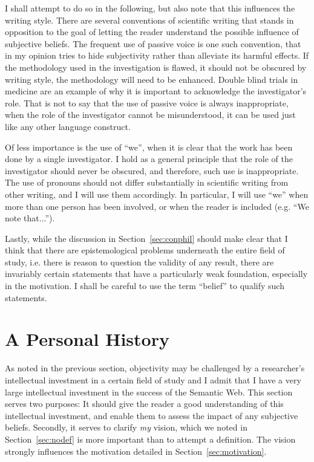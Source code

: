 I shall attempt to do so in the following, but also note that this
influences the writing style. There are several conventions of
scientific writing that stands in opposition to the goal of letting
the reader understand the possible influence of subjective
beliefs. The frequent use of passive voice is one such convention,
that in my opinion tries to hide subjectivity rather than alleviate
its harmful effects. If the methodology used in the investigation is
flawed, it should not be obscured by writing style, the methodology
will need to be enhanced. Double blind trials in medicine are an
example of why it is important to acknowledge the investigator's
role. That is not to say that the use of passive voice is always
inappropriate, when the role of the investigator cannot be
misunderstood, it can be used just like any other language construct.

Of less importance is the use of ``we'', when it is clear that the
work has been done by a single investigator. I hold as a general
principle that the role of the investigator should never be obscured,
and therefore, such use is inappropriate. The use of pronouns should
not differ substantially in scientific writing from other writing, and
I will use them accordingly. In particular, I will use ``we'' when
more than one person has been involved, or when the reader is included
(e.g. ``We note that...'').

Lastly, while the discussion in Section~\ref{sec:conphil} should make
clear that I think that there are epistemological problems underneath
the entire field of study, i.e. there is reason to question the
validity of any result, there are invariably certain statements that
have a particularly weak foundation, especially in the motivation. I
shall be careful to use the term ``belief'' to qualify such
statements.

\section{A Personal History}\label{sec:history}

As noted in the previous section, objectivity may be challenged by a
researcher's intellectual investment in a certain field of study and I
admit that I have a very large intellectual investment in the success
of the Semantic Web. This section serves two purposes: It should give
the reader a good understanding of this intellectual investment, and
enable them to assess the impact of any subjective beliefs. Secondly,
it serves to clarify \emph{my} vision, which we noted in
Section~\ref{sec:nodef} is more important than to attempt a
definition. The vision strongly influences the motivation detailed in
Section~\ref{sec:motivation}.


